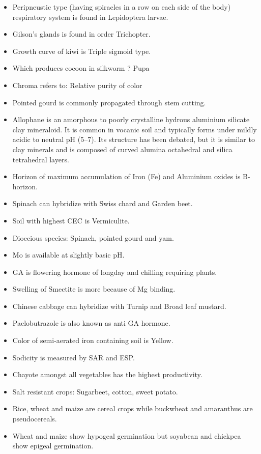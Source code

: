 \documentclass[
  openany]{book}
\begin{document}
\begin{itemize}
\item
  Peripneustic type (having spiracles in a row on each side of the body) respiratory system is found in Lepidoptera larvae.
\item
  Gilson's glands is found in order Trichopter.
\item
  Growth curve of kiwi is Triple sigmoid type.
\item
  Which produces cocoon in silkworm ? Pupa
\item
  Chroma refers to: Relative purity of color
\item
  Pointed gourd is commonly propagated through stem cutting.
\item
  Allophane is an amorphous to poorly crystalline hydrous aluminium silicate clay mineraloid. It is common in vocanic soil and typically forms under mildly acidic to neutral pH (5--7). Its structure has been debated, but it is similar to clay minerals and is composed of curved alumina octahedral and silica tetrahedral layers.
\item
  Horizon of maximum accumulation of Iron (Fe) and Aluminium oxides is B-horizon.
\item
  Spinach can hybridize with Swiss chard and Garden beet.
\item
  Soil with highest CEC is Vermiculite.
\item
  Dioecious species: Spinach, pointed gourd and yam.
\item
  Mo is available at slightly basic pH.
\item
  GA is flowering hormone of longday and chilling requiring plants.
\item
  Swelling of Smectite is more because of Mg binding.
\item
  Chinese cabbage can hybridize with Turnip and Broad leaf mustard.
\item
  Paclobutrazole is also known as anti GA hormone.
\item
  Color of semi-aerated iron containing soil is Yellow.
\item
  Sodicity is measured by SAR and ESP.
\item
  Chayote amongst all vegetables has the highest productivity.
\item
  Salt resistant crops: Sugarbeet, cotton, sweet potato.
\item
  Rice, wheat and maize are cereal crops while buckwheat and amaranthus are pseudocereals.
\item
  Wheat and maize show hypogeal germination but soyabean and chickpea show epigeal germination.

\end{itemize}
\end{document}
